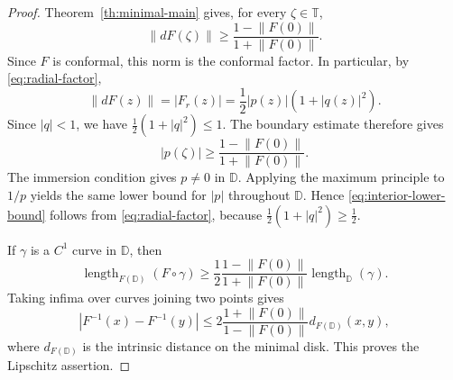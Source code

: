 \documentclass[10pt,a4paper]{amsart}
\newcommand{\D}{\mathbb D}
\newcommand{\T}{\mathbb T}
\newcommand{\norm}[1]{\left\|#1\right\|}
\begin{document}
\begin{proof}
Theorem~\ref{th:minimal-main} gives, for every \(\zeta\in\T\),
\[
        \norm{dF(\zeta)}
        \ge
        \frac{1-\norm{F(0)}}{1+\norm{F(0)}}.
\]
Since \(F\) is conformal, this norm is the conformal factor. In particular, by \eqref{eq:radial-factor},
\[
        \norm{dF(z)}=|F_r(z)|=\frac12 |p(z)|(1+|q(z)|^2).
\]
Since \(|q|<1\), we have \(\frac12(1+|q|^2)\le1\). The boundary estimate therefore gives
\[
        |p(\zeta)|
        \ge
        \frac{1-\norm{F(0)}}{1+\norm{F(0)}}.
\]
The immersion condition gives \(p\ne0\) in \(\D\). Applying the maximum principle to \(1/p\) yields the same lower bound for \(|p|\) throughout \(\D\). Hence \eqref{eq:interior-lower-bound} follows from \eqref{eq:radial-factor}, because \(\frac12(1+|q|^2)\ge\frac12\).

If \(\gamma\) is a \(C^1\) curve in \(\D\), then
\[
        \operatorname{length}_{F(\D)}(F\circ\gamma)
        \ge
        \frac12\frac{1-\norm{F(0)}}{1+\norm{F(0)}}
        \operatorname{length}_{\D}(\gamma).
\]
Taking infima over curves joining two points gives
\[
        |F^{-1}(x)-F^{-1}(y)|
        \le
        2\frac{1+\norm{F(0)}}{1-\norm{F(0)}}
        d_{F(\D)}(x,y),
\]
where \(d_{F(\D)}\) is the intrinsic distance on the minimal disk. This proves the Lipschitz assertion.
\end{proof}
\end{document}
